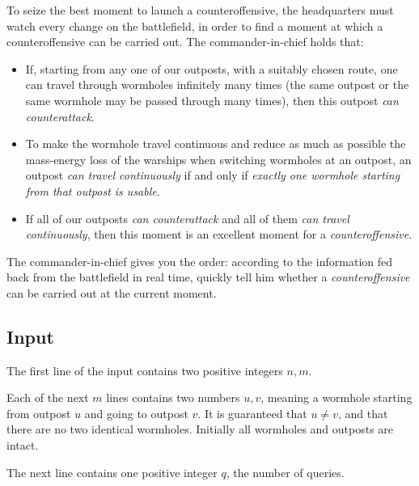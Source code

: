 \documentclass[11pt]{article}
\begin{document}
To seize the best moment to launch a counteroffensive,
the headquarters must watch every change on the battlefield,
in order to find a moment at which a counteroffensive can be carried out.
The commander-in-chief holds that:
\begin{itemize}
\item If, starting from any one of our outposts,
with a suitably chosen route,
one can travel through wormholes infinitely many times
(the same outpost or the same wormhole may be passed through many times),
then this outpost \emph{can counterattack}.
\item To make the wormhole travel continuous and reduce as much as
possible the mass-energy loss of the warships when switching wormholes
at an outpost,
an outpost \emph{can travel continuously} if and only if
\emph{exactly one wormhole starting from that outpost is usable}.
\item If all of our outposts \emph{can counterattack}
and all of them \emph{can travel continuously},
then this moment is an excellent moment for a \emph{counteroffensive}.
\end{itemize}
The commander-in-chief gives you the order:
according to the information fed back from the battlefield in real time,
quickly tell him whether a \emph{counteroffensive} can be carried out at
the current moment.

\subsection*{Input}

The first line of the input contains two positive integers $n, m$.

Each of the next $m$ lines contains two numbers $u, v$,
meaning a wormhole starting from outpost $u$ and going to outpost $v$.
It is guaranteed that $u \ne v$,
and that there are no two identical wormholes.
Initially all wormholes and outposts are intact.

The next line contains one positive integer $q$, the number of queries.
\end{document}
